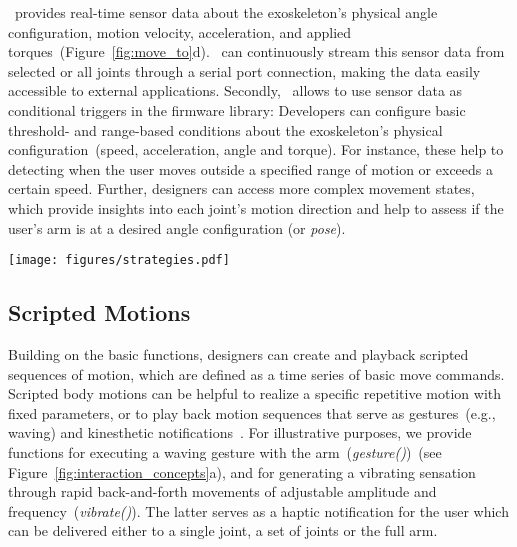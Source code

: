 \toolkit~provides real-time sensor data about the exoskeleton's physical angle configuration, motion velocity, acceleration, and applied torques~(Figure~\ref{fig:move_to}d). 
\toolkit~can continuously stream this sensor data from selected or all joints through a serial port connection, making the data easily accessible to external applications. Secondly, \toolkit~allows to use sensor data as conditional triggers in the firmware library: Developers can configure basic threshold- and range-based conditions about the exoskeleton's physical configuration~(speed, acceleration, angle and torque). For instance, these help to detecting when the user moves outside a specified range of motion or exceeds a certain speed. Further, designers can access more complex movement states, which provide insights into each joint's motion direction and help to assess if the user's arm is at a desired angle configuration (or \textit{pose}). 

\begin{figure*}[t]
    \centering
    \texttt{[image: figures/strategies.pdf]}
    \caption{\toolkit~provides functional abstractions for five relevant classes of augmentation strategies which enable to (a)~replay a scripted motion on demand, (b)~continuously transfer one user's motions onto another one, (c)~augment a user's motion effort by amplifying or resisting her ongoing motions, (d)~alter the user's motion style, or (e)~guide the user towards or away from an area.}
    \label{fig:interaction_concepts}
\end{figure*}


\subsection{Scripted Motions}
Building on the basic functions, designers can create and playback scripted sequences of motion, which are defined as a time series of basic move commands. 
Scripted body motions can be helpful to realize a specific repetitive motion with fixed parameters, or to play back motion sequences that serve as gestures~(e.g., waving) and kinesthetic notifications~\cite{catanua_2023}.
For illustrative purposes, we provide functions for executing a waving gesture with the arm~(\textit{gesture()})~(see Figure~\ref{fig:interaction_concepts}a), and for generating a vibrating sensation through rapid back-and-forth movements of adjustable amplitude and frequency~(\textit{vibrate()}). The latter serves as a haptic notification for the user which can be delivered either to a single joint, a set of joints or the full arm.

